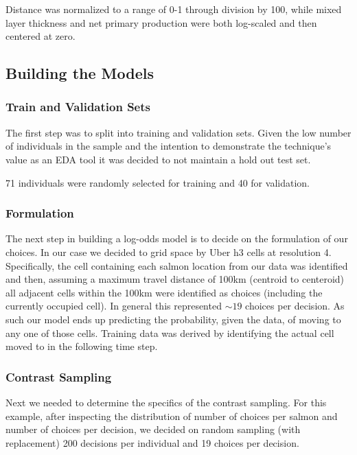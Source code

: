 \documentclass[11pt]{article}
\begin{document}
Distance was normalized to a range of 0-1 through division by 100, while mixed layer thickness and net primary production were both log-scaled and then centered at zero. 

\subsection*{Building the Models}

\subsubsection*{Train and Validation Sets} 

The first step was to split into training and validation sets. Given the low number of individuals in the sample and the intention to demonstrate the technique's value as an EDA tool it was decided to not maintain a hold out test set.

71 individuals were randomly selected for training and 40 for validation.

\subsubsection*{Formulation}

The next step in building a log-odds model is to decide on the formulation of our choices. In our case we decided to grid space by Uber h3 cells at resolution 4. Specifically, the cell containing each salmon location from our data was identified and then, assuming a maximum travel distance of 100km (centroid to centeroid) all adjacent cells within the 100km were identified as choices (including the currently occupied cell). In general this represented $\sim 19$ choices per decision. As such our model ends up predicting the probability, given the data, of moving to any one of those cells. Training data was derived by identifying the actual cell moved to in the following time step. 

\subsubsection*{Contrast Sampling}

Next we needed to determine the specifics of the contrast sampling. For this example, after inspecting the distribution of number of choices per salmon and number of choices per decision, we decided on random sampling (with replacement) 200 decisions per individual and 19 choices per decision. 
\end{document}
